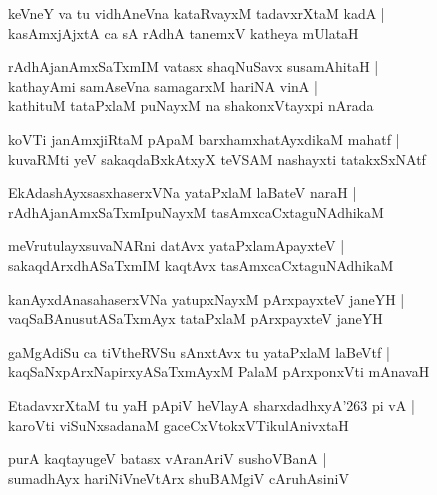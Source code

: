 \begin{shloka}
keVneY va tu vidhAneVna kataRvayxM tadavxrXtaM kadA |\\
kasAmxjAjxtA ca sA rAdhA tanemxV katheya mUlataH
\end{shloka}

\begin{shloka}
rAdhAjanAmxSaTxmIM vatasx shaqNuSavx susamAhitaH |\\
kathayAmi samAseVna samagarxM hariNA vinA |\\
kathituM tataPxlaM puNayxM na shakonxVtayxpi nArada
\end{shloka}

\begin{shloka}
koVTi janAmxjiRtaM pApaM barxhamxhatAyxdikaM mahatf |\\
kuvaRMti yeV sakaqdaBxkAtxyX teVSAM nashayxti tatakxSxNAtf
\end{shloka}

\begin{shloka}
EkAdashAyxsasxhaserxVNa yataPxlaM laBateV naraH |\\
rAdhAjanAmxSaTxmIpuNayxM tasAmxcaCxtaguNAdhikaM
\end{shloka}

\begin{shloka}
meVrutulayxsuvaNARni datAvx yataPxlamApayxteV |\\
sakaqdArxdhASaTxmIM kaqtAvx tasAmxcaCxtaguNAdhikaM
\end{shloka}

\begin{shloka}
kanAyxdAnasahaserxVNa yatupxNayxM pArxpayxteV janeYH |\\
vaqSaBAnusutASaTxmAyx tataPxlaM pArxpayxteV janeYH
\end{shloka}

\begin{shloka}
gaMgAdiSu ca tiVtheRVSu sAnxtAvx tu yataPxlaM laBeVtf |\\
kaqSaNxpArxNapirxyASaTxmAyxM PalaM pArxponxVti mAnavaH
\end{shloka}

\begin{shloka}
EtadavxrXtaM tu yaH pApiV heVlayA sharxdadhxyA\char'263 pi vA |\\
karoVti viSuNxsadanaM gaceCxVtokxVTikulAnivxtaH
\end{shloka}

\begin{shloka}
purA kaqtayugeV batasx vAranAriV sushoVBanA |\\
sumadhAyx hariNiVneVtArx shuBAMgiV cAruhAsiniV
\end{shloka}

